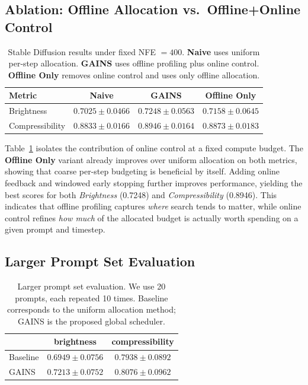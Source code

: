 \subsection{Ablation: Offline Allocation vs.\ Offline+Online Control}
\label{sec:exp-ablation-offline-online}
\begin{table}[t]
\centering
\caption{Stable Diffusion results under fixed NFE $=400$.
\textbf{Naive} uses uniform per-step allocation.
\textbf{GAINS} uses offline profiling plus online control.
\textbf{Offline Only} removes online control and uses only offline allocation.}
\label{tab:sd_400_ablation}
\begin{tabular}{lccc}
\toprule
\textbf{Metric} & \textbf{Naive} & \textbf{GAINS} & \textbf{Offline Only} \\
\midrule
Brightness        & $0.7025 \pm 0.0466$ & $\mathbf{0.7248 \pm 0.0563}$ & $0.7158 \pm 0.0645$ \\
Compressibility   & $0.8833 \pm 0.0166$ & $\mathbf{0.8946 \pm 0.0164}$ & $0.8873 \pm 0.0183$ \\
\bottomrule
\end{tabular}
\end{table}

Table~\ref{tab:sd_400_ablation} isolates the contribution of online control at a fixed compute budget.
The \textbf{Offline Only} variant already improves over uniform allocation on both metrics, showing that coarse per-step budgeting is beneficial by itself.
Adding online feedback and windowed early stopping further improves performance, yielding the best scores for both \textit{Brightness} (0.7248) and \textit{Compressibility} (0.8946).
This indicates that offline profiling captures \emph{where} search tends to matter, while online control refines \emph{how much} of the allocated budget is actually worth spending on a given prompt and timestep.

\subsection{Larger Prompt Set Evaluation}
\label{sec:exp-larger-prompts}
\begin{table}[t]
\centering
\caption{Larger prompt set evaluation.
We use 20 prompts, each repeated 10 times.
Baseline corresponds to the uniform allocation method; GAINS is the proposed global scheduler.}
\label{tab:larger_prompt_exp}
\begin{tabular}{lcc}
\toprule
 & \textbf{brightness} & \textbf{compressibility} \\
\midrule
Baseline          & $0.6949 \pm 0.0756$ & $0.7938 \pm 0.0892$ \\
GAINS             & $\mathbf{0.7213 \pm 0.0752}$ & $\mathbf{0.8076 \pm 0.0962}$ \\
\bottomrule
\end{tabular}
\end{table}


